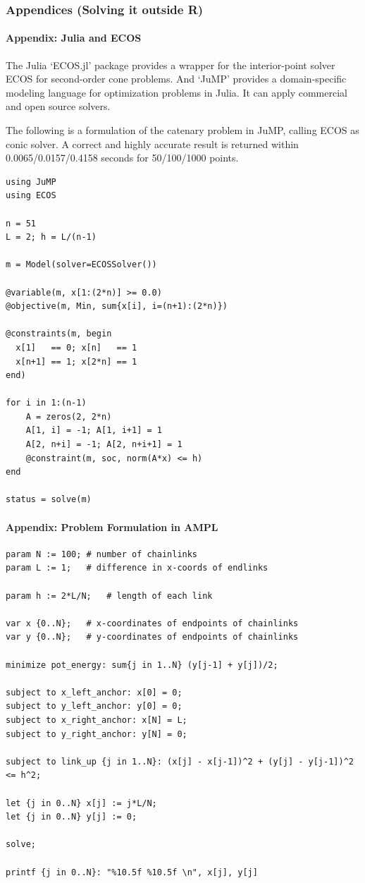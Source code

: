 \documentclass[]{article}
\let\oldparagraph\paragraph
\renewcommand{\paragraph}[1]{\oldparagraph{#1}\mbox{}}
\begin{document}
\subsubsection{Appendices (Solving it outside
R)}\label{appendices-solving-it-outside-r}

\paragraph{Appendix: Julia and ECOS}\label{appendix-julia-and-ecos}

The Julia `ECOS.jl' package provides a wrapper for the interior-point
solver ECOS for second-order cone problems. And `JuMP' provides a
domain-specific modeling language for optimization problems in Julia. It
can apply commercial and open source solvers.

The following is a formulation of the catenary problem in JuMP, calling
ECOS as conic solver. A correct and highly accurate result is returned
within 0.0065/0.0157/0.4158 seconds for 50/100/1000 points.

\begin{verbatim}
using JuMP
using ECOS

n = 51
L = 2; h = L/(n-1)

m = Model(solver=ECOSSolver())

@variable(m, x[1:(2*n)] >= 0.0)
@objective(m, Min, sum{x[i], i=(n+1):(2*n)})

@constraints(m, begin
  x[1]   == 0; x[n]   == 1
  x[n+1] == 1; x[2*n] == 1
end)

for i in 1:(n-1)
    A = zeros(2, 2*n)
    A[1, i] = -1; A[1, i+1] = 1
    A[2, n+i] = -1; A[2, n+i+1] = 1
    @constraint(m, soc, norm(A*x) <= h)
end

status = solve(m)
\end{verbatim}

\paragraph{Appendix: Problem Formulation in
AMPL}\label{appendix-problem-formulation-in-ampl}

\begin{verbatim}
param N := 100; # number of chainlinks
param L := 1;   # difference in x-coords of endlinks

param h := 2*L/N;   # length of each link

var x {0..N};   # x-coordinates of endpoints of chainlinks
var y {0..N};   # y-coordinates of endpoints of chainlinks

minimize pot_energy: sum{j in 1..N} (y[j-1] + y[j])/2;

subject to x_left_anchor: x[0] = 0;
subject to y_left_anchor: y[0] = 0;
subject to x_right_anchor: x[N] = L;
subject to y_right_anchor: y[N] = 0;

subject to link_up {j in 1..N}: (x[j] - x[j-1])^2 + (y[j] - y[j-1])^2 <= h^2;

let {j in 0..N} x[j] := j*L/N;
let {j in 0..N} y[j] := 0;

solve;

printf {j in 0..N}: "%10.5f %10.5f \n", x[j], y[j]
\end{verbatim}
\end{document}
